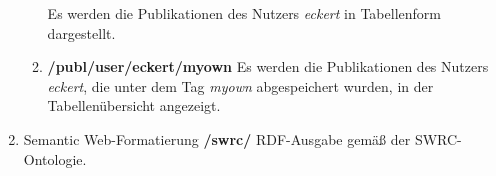 \begin{enumerate}
\begin{enumerate}
        Es werden die Publikationen des Nutzers \textit{eckert} in Tabellenform dargestellt.
        \item \textbf{ /publ/user/eckert/myown} \newline
        Es werden die Publikationen des Nutzers \textit{eckert}, die unter dem Tag \textit{myown} abgespeichert wurden, in der Tabellenübersicht angezeigt. 
    \end{enumerate}
    \item Semantic Web-Formatierung
    \newline \newline \textbf{/swrc/} \newline
        RDF-Ausgabe gemäß der SWRC-Ontologie.
    
\end{enumerate}

